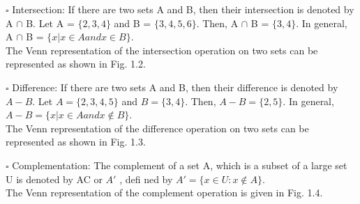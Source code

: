 \documentclass[12pt,a4paper]{book}
\def\firstcircle{(0,0) circle (1.5cm)}
\def\secondcircle{(0:2cm) circle (1.5cm)}
\begin{document}
$\square$ Intersection: If there are two sets A and B, then their intersection is
denoted by A $\cap$ B. Let A = $\{2, 3, 4\}$ and B = $\{3, 4, 5, 6\}$. Then, A $\cap$ B =
$\{3, 4\}$. In general, A $\cap$ B = $\{x | x \in A and x \in B\}$.\\
The Venn representation of the intersection operation on two sets can
be represented as shown in Fig. 1.2.\\
\begin{center}
\end{center}
$\square$ Difference: If there are two sets A and B, then their difference is denoted
by $A − B$. Let $A = \{2, 3, 4, 5\}$ and $B = \{3, 4\}$. Then, $A − B = \{2, 5\}$. In
general, $A − B = \{x | x \in A and x \notin  B\}$.\\
The Venn representation of the difference operation on two sets can be
represented as shown in Fig. 1.3.\\
\begin{center}


\end{center}
$\square$ Complementation: The complement of a set A, which is a subset of a
large set U is denoted by AC or $A\prime$ , defi ned by $A\prime = \{x \in U: x \notin  A\}$.\\
The Venn representation of the complement operation is given in
Fig. 1.4.\\
\end{document}
